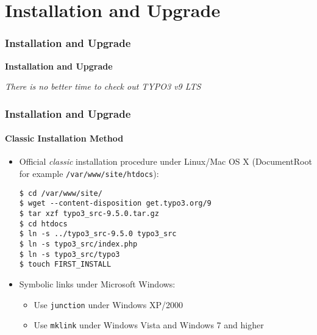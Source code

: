 %

\section{Installation and Upgrade}
\begin{frame}[fragile]
	\frametitle{Installation and Upgrade}

	\begin{center}\huge{\color{typo3darkgrey}\textbf{Installation and Upgrade}}\end{center}
	\begin{center}\large{\textit{There is no better time to check out TYPO3 v9 LTS}}\end{center}

\end{frame}


\begin{frame}[fragile]
	\frametitle{Installation and Upgrade}
	\framesubtitle{Classic Installation Method}

	\begin{itemize}
		\item Official \textit{classic} installation procedure under Linux/Mac OS X\newline
			(DocumentRoot for example \texttt{/var/www/site/htdocs}):
\begin{lstlisting}
$ cd /var/www/site/
$ wget --content-disposition get.typo3.org/9
$ tar xzf typo3_src-9.5.0.tar.gz
$ cd htdocs
$ ln -s ../typo3_src-9.5.0 typo3_src
$ ln -s typo3_src/index.php
$ ln -s typo3_src/typo3
$ touch FIRST_INSTALL
\end{lstlisting}

		\item Symbolic links under Microsoft Windows:

			\begin{itemize}
				\item Use \texttt{junction} under Windows XP/2000
				\item Use \texttt{mklink} under Windows Vista and Windows 7 and higher
			\end{itemize}

	\end{itemize}
\end{frame}

